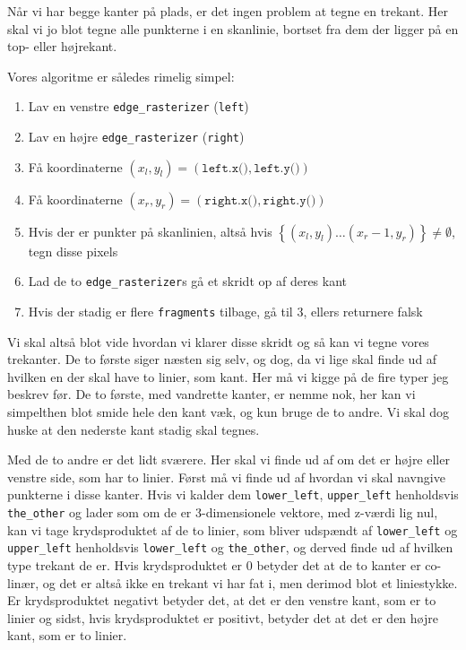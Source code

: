 \documentclass[a4paper, 10pt]{article}
\begin{document}
Når vi har begge kanter på plads, er det ingen problem at tegne en trekant.
Her skal vi jo blot tegne alle punkterne i en skanlinie, bortset fra dem der ligger på en top- eller højrekant.

Vores algoritme er således rimelig simpel:

\begin{enumerate}
\item Lav en venstre \texttt{edge\_rasterizer} (\texttt{left})
\item Lav en højre \texttt{edge\_rasterizer} (\texttt{right})
\item Få koordinaterne $(x_l, y_l) = (\texttt{left.x()}, \texttt{left.y()})$
\item Få koordinaterne $(x_r, y_r) = (\texttt{right.x()}, \texttt{right.y()})$
\item Hvis der er punkter på skanlinien, altså hvis $\left\lbrace (x_l, y_l) \dots (x_r - 1, y_r) \right\rbrace \not = \emptyset$, tegn disse pixels
\item Lad de to \texttt{edge\_rasterizer}s gå et skridt op af deres kant
\item Hvis der stadig er flere \texttt{fragments} tilbage, gå til 3, ellers returnere falsk
\end{enumerate}

Vi skal altså blot vide hvordan vi klarer disse skridt og så kan vi tegne vores trekanter.
De to første siger næsten sig selv, og dog, da vi lige skal finde ud af hvilken en der skal have to linier, som kant.
Her må vi kigge på de fire typer jeg beskrev før.
De to første, med vandrette kanter, er nemme nok, her kan vi simpelthen blot smide hele den kant væk, og kun bruge de to andre.
Vi skal dog huske at den nederste kant stadig skal tegnes.

Med de to andre er det lidt sværere.
Her skal vi finde ud af om det er højre eller venstre side, som har to linier.
Først må vi finde ud af hvordan vi skal navngive punkterne i disse kanter.
Hvis vi kalder dem \texttt{lower\_left}, \texttt{upper\_left} henholdsvis \texttt{the\_other} og lader som om de er 3-dimensionele vektore, med z-værdi lig nul, kan vi tage krydsproduktet af de to linier, som bliver udspændt af \texttt{lower\_left} og \texttt{upper\_left} henholdsvis \texttt{lower\_left} og \texttt{the\_other}, og derved finde ud af hvilken type trekant de er.
Hvis krydsproduktet er $0$ betyder det at de to kanter er co-linær, og det er altså ikke en trekant vi har fat i, men derimod blot et liniestykke.
Er krydsproduktet negativt betyder det, at det er den venstre kant, som er to linier og sidst, hvis krydsproduktet er positivt, betyder det at det er den højre kant, som er to linier.
\end{document}
